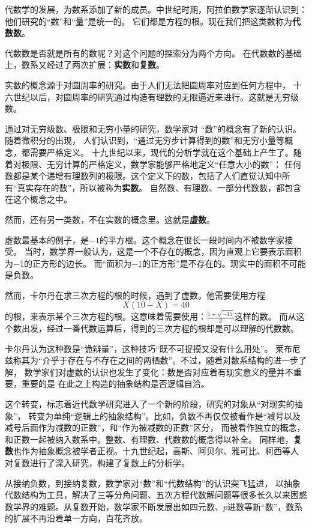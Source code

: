 \documentclass[12pt,UTF8,fontset=none]{ctexbook}
\begin{document}
\begin{appendix}
代数学的发展，为数系添加了新的成员。中世纪时期，阿拉伯数学家逐渐认识到：他们研究的“数”和“量”是统一的。
它们都是方程的根。现在我们把这类数称为\textbf{代数数}。

代数数是否就是所有的数呢？对这个问题的探索分为两个方向。
在代数数的基础上，数系又经过了两次扩展：\textbf{实数}和\textbf{复数}。

实数的概念源于对圆周率的研究。由于人们无法把圆周率对应到任何方程中，
十六世纪以后，对圆周率的研究通过构造有理数的无限逼近来进行。这就是无穷级数。

通过对无穷级数、极限和无穷小量的研究，数学家对
“数”的概念有了新的认识。随着微积分的出现，
人们认识到，“通过无穷步计算得到的数”和无穷小量等概念，都需要严格定义。
十九世纪以来，现代的分析学就在这个基础上产生了。随着对极限、无穷计算的严格定义，数学家能够严格地定义“任意大小的数”：
任何数都是某个递增有理数列的极限。这个定义下的数，包括了人们直觉认知中所有“真实存在的数”，所以被称为\textbf{实数}。
自然数、有理数、一部分代数数，都包含在这个概念之中。

然而，还有另一类数，不在实数的概念里。这就是\textbf{虚数}。

虚数最基本的例子，是$-1$的平方根。这个概念在很长一段时间内不被数学家接受。
当时，数学界一般认为，这是一个不存在的概念，因为直观上它要表示面积为$-1$的正方形的边长。
而“面积为$-1$的正方形”是不存在的。现实中的面积不可能是负数。

然而，卡尔丹在求三次方程的根的时候，遇到了虚数。他需要使用方程
$$X(10 - X) = 40$$
的根，来表示某个三次方程的根。这意味着需要使用：$\frac{5 + \sqrt{-15}}{2}$这样的数。
而从这个数出发，经过一番代数运算后，得到的三次方程的根却是可以理解的代数数。

卡尔丹认为这种数是“诡辩量”，这种技巧“既不可捉摸又没有什么用处”。
莱布尼兹称其为“介乎于存在与不存在之间的两栖数”。不过，随着对数系结构的进一步了解，
数学家们对虚数的认识也发生了变化：数是否对应着有现实意义的量并不重要，重要的是
在此之上构造的抽象结构是否逻辑自洽。

这个转变，标志着近代数学研究进入了一个新的阶段，研究的对象从“对现实的抽象”，
转变为单纯“逻辑上的抽象结构”。比如，负数不再仅仅被看作是“减号以及减号后面作为减数的正数”，和“作为被减数的正数”区分，
而被看作独立的概念，和正数一起被纳入数系中。整数、有理数、代数数的概念得以补全。
同样地，\textbf{复数}也作为抽象概念被学者正视。十九世纪起，高斯、阿贝尔、雅可比、柯西等人
对复数进行了深入研究，构建了复数上的分析学。

从接纳负数，到接纳复数，数学家对“数”和“代数结构”的认识突飞猛进，
以抽象代数结构为工具，解决了三等分角问题、五次方程代数解问题等很多长久以来困惑数学界的难题。从复数开始，数学家不断发展出如四元数、$p$进数等新“数”，数系的扩展不再沿着单一方向，百花齐放。


\end{appendix}
\end{document}
